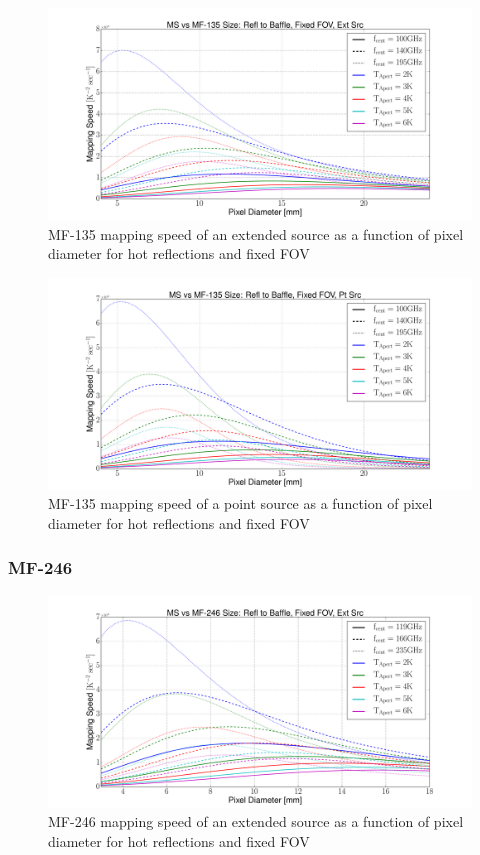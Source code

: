 \documentclass[12pt, titlepage]{article} %
\begin{document}
\begin{figure}[H]
	\centering
	\includegraphics[width=1.1\textwidth, center]{PDF/LFT_MS_MF-135_hotRefl_fixFOV_extSrc.pdf}
	\caption{MF-135 mapping speed of an extended source as a function of pixel diameter for hot reflections and fixed FOV}
\end{figure}

\begin{figure}[H]
	\centering
	\includegraphics[width=1.1\textwidth, center]{PDF/LFT_MS_MF-135_hotRefl_fixFOV_ptSrc.pdf}
	\caption{MF-135 mapping speed of a point source as a function of pixel diameter for hot reflections and fixed FOV}
\end{figure}


\subsubsection{MF-246}

\begin{figure}[H]
	\centering
	\includegraphics[width=1.1\textwidth, center]{PDF/LFT_MS_MF-246_hotRefl_fixFOV_extSrc.pdf}
	\caption{MF-246 mapping speed of an extended source as a function of pixel diameter for hot reflections and fixed FOV}
\end{figure}
\end{document}
